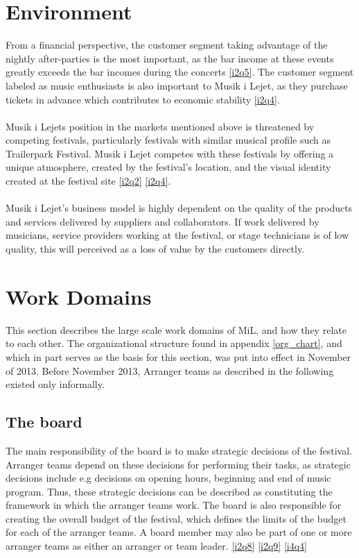\section{Environment}
From a financial perspective, the customer segment taking advantage of the nightly after-parties is the most important, as the bar income at these events greatly exceeds the bar incomes during the concerts \ref{i2q5}. The customer segment labeled as music enthusiasts is also important to Musik i Lejet, as they purchase tickets in advance which contributes to economic stability \ref{i2q4}.
\\ \\
Musik i Lejets position in the markets mentioned above is threatened by competing festivals, particularly festivals with similar musical profile such as Trailerpark Festival. Musik i Lejet competes with these festivals by offering a unique atmosphere, created by the festival's location, and the visual identity created at the festival site \ref{i2q2} \ref{i2q4}.
\\ \\
Musik i Lejet's business model is highly dependent on the quality of the products and services delivered by suppliers and collaborators. If work delivered by musicians, service providers working at the festival, or stage technicians is of low quality, this will perceived as a loss of value by the customers directly. 

\section{Work Domains}
\label{sec:work_domains}
This section describes the large scale work domains of MiL, and how they relate to each other. The organizational structure found in appendix \ref{org_chart}, and which in part serves as the basis for this section, was put into effect in November of 2013. Before November 2013, Arranger teams as described in the following existed only informally.
\subsection{The board}
\label{sub:the_board}
The main responsibility of the board is to make strategic decisions of the festival. Arranger teams depend on these decisions for performing their tasks, as strategic decisions include e.g decisions on opening hours, beginning and end of music program. Thus, these strategic decisions can be described as constituting the framework in which the arranger teams work. The board is also responsible for creating the overall budget of the festival, which defines the limits of the budget for each of the arranger teams. A board member may also be part of one or more arranger teams as either an arranger or team leader. \ref{i2q8} \ref{i2q9} \ref{i4q4}

